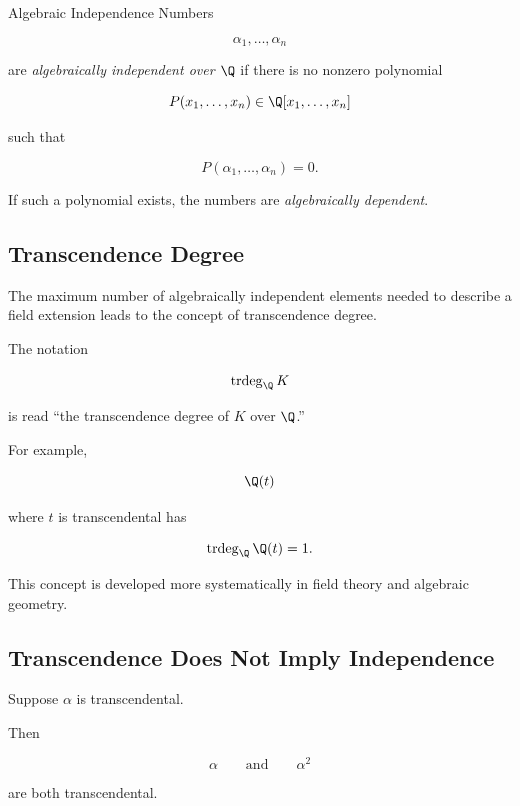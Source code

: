 \begin{definitionbox}{Algebraic Independence}
Numbers

\[ \alpha_1,\ldots,\alpha_n \]

are \emph{algebraically independent over \(\Q\)} if there is no nonzero
polynomial

\[ P(x_1,\ldots,x_n)\in\Q[x_1,\ldots,x_n] \]

such that

\[ \boxed{P(\alpha_1,\ldots,\alpha_n)=0.} \]
\end{definitionbox}

If such a polynomial exists, the numbers are \emph{algebraically dependent}.

\subsection{Transcendence Degree}
\label{subsec:transcendence-degree}

The maximum number of algebraically independent elements needed to describe
a field extension leads to the concept of transcendence degree.

The notation

\[ \operatorname{trdeg}_{\Q}K \]

is read ``the transcendence degree of \(K\) over \(\Q\).''

For example,

\[ \Q(t) \]

where \(t\) is transcendental has

\[ \operatorname{trdeg}_{\Q}\Q(t)=1. \]

This concept is developed more systematically in field theory and algebraic
geometry.

\subsection{Transcendence Does Not Imply Independence}
\label{subsec:transcendence-not-independence}

Suppose \(\alpha\) is transcendental.

Then

\[ \alpha\qquad\text{and}\qquad\alpha^2 \]

are both transcendental.

